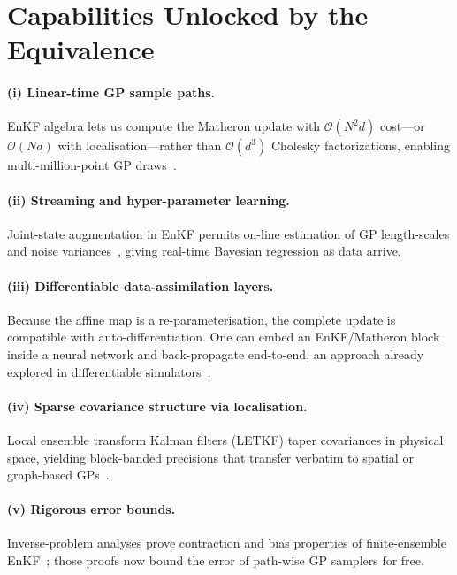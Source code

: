 \documentclass[wcp]{jmlr} %
\begin{document}
\section{Capabilities Unlocked by the Equivalence}\label{sec:capabilities}

\paragraph{(i) Linear-time GP sample paths.}
EnKF algebra lets us compute the Matheron update with $\mathcal O(N^2d)$ cost—or $\mathcal O(Nd)$ with localisation—rather than $\mathcal O(d^{3})$ Cholesky factorizations, enabling multi-million-point GP draws~\citep{Wilson2020Efficiently,Hunt2007Efficient}.

\paragraph{(ii) Streaming and hyper-parameter learning.}
Joint-state augmentation in EnKF permits on-line estimation of GP length-scales and noise variances~\citep{Kuzin2018Ensemble}, giving real-time Bayesian regression as data arrive.

\paragraph{(iii) Differentiable data-assimilation layers.}
Because the affine map is a re-parameterisation, the complete update is compatible with auto-differentiation.  One can embed an EnKF/Matheron block inside a neural network and back-propagate end-to-end, an approach already explored in differentiable simulators~\citep{Spantini2022Coupling,Schillings2017Analysis}.

\paragraph{(iv) Sparse covariance structure via localisation.}
Local ensemble transform Kalman filters (LETKF) taper covariances in physical space, yielding block-banded precisions that transfer verbatim to spatial or graph-based GPs~\citep{Hunt2007Efficient}.

\paragraph{(v) Rigorous error bounds.}
Inverse-problem analyses prove contraction and bias properties of finite-ensemble EnKF~\citep{Schillings2017Analysis}; those proofs now bound the error of path-wise GP samplers for free.
\end{document}

